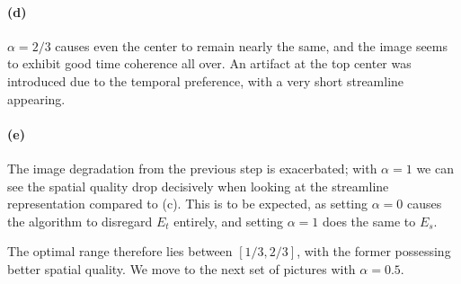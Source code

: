 \paragraph*{(d)} $\alpha=2/3$ causes even the center to remain nearly the same, and the image seems to exhibit good time coherence all over.
An artifact at the top center was introduced due to the temporal preference, with a very short streamline appearing.
\paragraph*{(e)} The image degradation from the previous step is exacerbated;
with $\alpha=1$ we can see the spatial quality drop decisively when looking at the streamline representation compared to (c).
This is to be expected, as setting $\alpha=0$ causes the algorithm to disregard $E_t$ entirely, and setting $\alpha=1$ does the same to $E_s$.

The optimal range therefore lies between $[1/3 , 2/3]$, with the former possessing better spatial quality.
We move to the next set of pictures with $\alpha = 0.5$.

\newpage

